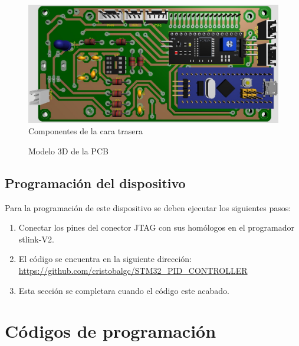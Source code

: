 \documentclass[10pt,a4paper,oneside]{article}
\begin{document}
\begin{figure}[H]
\centering
\includegraphics[scale=0.5]{Imagenes/PCB_COMPONENTES_CARA_TRASERA.jpg}
\caption[Vista de los componentes de la cara trasera de la PCB]{Componentes de la cara trasera}
\label{fig:005}
\end{figure}

\begin{figure}[h]
\centering
{}
 \caption[Vista 3D del modelo de la PCB]{Modelo 3D de la PCB}
\label{fig:PCB_3D_MODEL}
\end{figure}

\subsection{Programación del dispositivo}%

Para la programación de este dispositivo se deben ejecutar los siguientes pasos:

\begin{enumerate}
	\item Conectar los pines del conector JTAG con sus homólogos en el programador stlink-V2.
	\item El código se encuentra en la siguiente dirección: \url{https://github.com/cristobalgc/STM32_PID_CONTROLLER}
	\item Esta sección se completara cuando el código este acabado.
\end{enumerate}

\section{Códigos de programación}%
\end{document}
